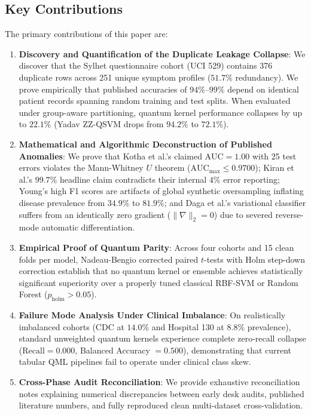 \documentclass[journal,twocolumn]{IEEEtran}
\begin{document}
\subsection{Key Contributions}
The primary contributions of this paper are:
\begin{enumerate}
    \item \textbf{Discovery and Quantification of the Duplicate Leakage Collapse}: We discover that the Sylhet questionnaire cohort (UCI 529) contains 376 duplicate rows across 251 unique symptom profiles ($51.7\%$ redundancy). We prove empirically that published accuracies of $94\%$--$99\%$ depend on identical patient records spanning random training and test splits. When evaluated under group-aware partitioning, quantum kernel performance collapses by up to $22.1\%$ (Yadav ZZ-QSVM drops from $94.2\%$ to $72.1\%$).
    \item \textbf{Mathematical and Algorithmic Deconstruction of Published Anomalies}: We prove that Kotha et al.'s claimed $\text{AUC}=1.00$ with 25 test errors violates the Mann-Whitney $U$ theorem ($\text{AUC}_{\max} \le 0.9700$); Kiran et al.'s $99.7\%$ headline claim contradicts their internal $4\%$ error reporting; Young's high F1 scores are artifacts of global synthetic oversampling inflating disease prevalence from $34.9\%$ to $81.9\%$; and Daga et al.'s variational classifier suffers from an identically zero gradient ($\|\nabla\|_2 = 0$) due to severed reverse-mode automatic differentiation.
    \item \textbf{Empirical Proof of Quantum Parity}: Across four cohorts and 15 clean folds per model, Nadeau-Bengio corrected paired $t$-tests with Holm step-down correction establish that no quantum kernel or ensemble achieves statistically significant superiority over a properly tuned classical RBF-SVM or Random Forest ($p_{\text{holm}} > 0.05$).
    \item \textbf{Failure Mode Analysis Under Clinical Imbalance}: On realistically imbalanced cohorts (CDC at $14.0\%$ and Hospital 130 at $8.8\%$ prevalence), standard unweighted quantum kernels experience complete zero-recall collapse ($\text{Recall} = 0.000$, Balanced Accuracy $= 0.500$), demonstrating that current tabular QML pipelines fail to operate under clinical class skew.
    \item \textbf{Cross-Phase Audit Reconciliation}: We provide exhaustive reconciliation notes explaining numerical discrepancies between early desk audits, published literature numbers, and fully reproduced clean multi-dataset cross-validation.
\end{enumerate}
\end{document}
